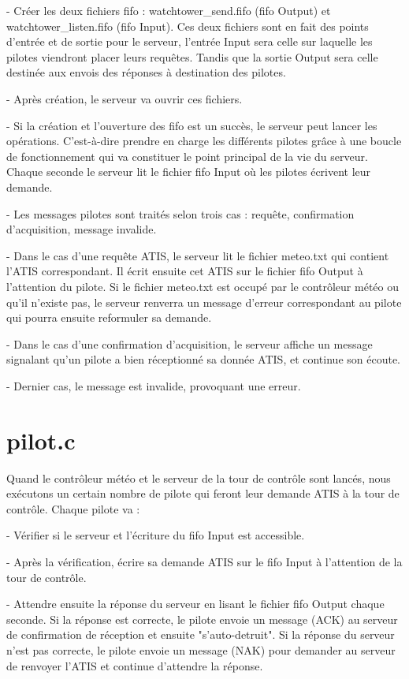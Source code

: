 \documentclass{report}
\begin{document}
{		- Créer les deux fichiers fifo : watchtower\_send.fifo (fifo Output) et watchtower\_listen.fifo (fifo Input).
		Ces deux fichiers sont en fait des points d'entrée et de sortie pour le serveur, l'entrée Input sera celle sur laquelle les pilotes viendront placer leurs requêtes.
		Tandis que la sortie Output sera celle destinée aux envois des réponses à destination des pilotes.

		- Après création, le serveur va ouvrir ces fichiers.

		- Si la création et l'ouverture des fifo est un succès, le serveur peut lancer les opérations. C'est-à-dire prendre en charge les différents pilotes grâce à une boucle de fonctionnement qui va constituer le point principal de la vie du serveur.
		Chaque seconde le serveur lit le fichier fifo Input où les pilotes écrivent leur demande.

		- Les messages pilotes sont traités selon trois cas : requête, confirmation d'acquisition, message invalide.

		- Dans le cas d'une requête ATIS, le serveur lit le fichier meteo.txt qui contient l'ATIS correspondant. Il écrit ensuite cet ATIS sur le fichier fifo Output à l'attention du pilote. 
		Si le fichier meteo.txt est occupé par le contrôleur météo ou qu'il n'existe pas, le serveur renverra un message d'erreur correspondant au pilote qui pourra ensuite reformuler sa demande.

		- Dans le cas d'une confirmation d’acquisition, le serveur affiche un message signalant qu'un pilote a bien réceptionné sa donnée ATIS, et continue son écoute.

		- Dernier cas, le message est invalide, provoquant une erreur.
 

	\section{pilot.c}
		
		Quand le contrôleur météo et le serveur de la tour de contrôle sont lancés, nous exécutons un certain nombre de pilote qui feront leur demande ATIS à la tour de contrôle.
		Chaque pilote va : 
		
		- Vérifier si le serveur et l'écriture du fifo Input est accessible.
		
		- Après la vérification, écrire sa demande ATIS sur le fifo Input à l'attention de la tour de contrôle.
		
		- Attendre ensuite la réponse du serveur en lisant le fichier fifo Output chaque seconde. Si la réponse est correcte, le pilote envoie un message (ACK) au serveur de confirmation de réception et ensuite "s'auto-detruit".  Si la réponse du serveur n'est pas correcte, le pilote envoie un message (NAK) pour demander au serveur de renvoyer l'ATIS et continue d'attendre la réponse.
		
}
\end{document}
